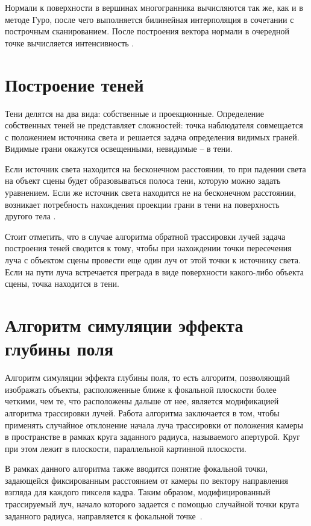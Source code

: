 Нормали к поверхности в вершинах многогранника вычисляются так же, как и в методе Гуро, после чего выполняется билинейная интерполяция в сочетании с построчным сканированием. После построения вектора нормали в очередной точке вычисляется интенсивность \cite{lit5}.

\section{Построение теней}
Тени делятся на два вида: собственные и проекционные. Определение собственных теней не представляет сложностей: точка наблюдателя совмещается с положением источника света и решается задача определения видимых граней. Видимые грани окажутся освещенными, невидимые -- в тени.

Если источник света находится на бесконечном расстоянии, то при падении света на объект сцены будет образовываться полоса тени, которую можно задать уравнением. Если же источник света находится не на бесконечном расстоянии, возникает потребность нахождения проекции грани в тени на поверхность другого тела \cite{lit6}.

Стоит отметить, что в случае алгоритма обратной трассировки лучей задача построения теней сводится к тому, чтобы при нахождении точки пересечения луча с объектом сцены провести еще один луч от этой точки к источнику света. Если на пути луча встречается преграда в виде поверхности какого-либо объекта сцены, точка находится в тени.

\section{Алгоритм симуляции эффекта глубины поля}
Алгоритм симуляции эффекта глубины поля, то есть алгоритм, позволяющий изображать объекты, расположенные ближе к фокальной плоскости более четкими, чем те, что расположены дальше от нее, является модификацией алгоритма трассировки лучей. Работа алгоритма заключается в том, чтобы применять случайное отклонение начала луча трассировки от положения камеры в пространстве в рамках круга заданного радиуса, называемого апертурой. Круг при этом лежит в плоскости, параллельной картинной плоскости.

В рамках данного алгоритма также вводится понятие фокальной точки, задающейся фиксированным расстоянием от камеры по вектору направления взгляда для каждого пикселя кадра. Таким образом, модифицированный трассируемый луч, начало которого задается с помощью случайной точки круга заданного радиуса, направляется к фокальной точке~\cite{DOF}.



